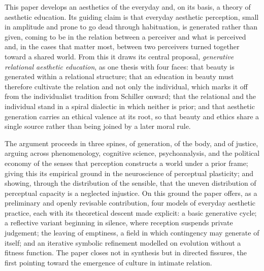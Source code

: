 This paper develops an aesthetics of the everyday and, on its basis, a theory of aesthetic education. Its guiding claim is that everyday aesthetic perception, small in amplitude and prone to go dead through habituation, is generated rather than given, coming to be in the relation between a perceiver and what is perceived and, in the cases that matter most, between two perceivers turned together toward a shared world. From this it draws its central proposal, \emph{generative relational aesthetic education}, as one thesis with four faces: that beauty is generated within a relational structure; that an education in beauty must therefore cultivate the relation and not only the individual, which marks it off from the individualist tradition from Schiller onward; that the relational and the individual stand in a spiral dialectic in which neither is prior; and that aesthetic generation carries an ethical valence at its root, so that beauty and ethics share a single source rather than being joined by a later moral rule.

The argument proceeds in three spines, of generation, of the body, and of justice, arguing across phenomenology, cognitive science, psychoanalysis, and the political economy of the senses that perception constructs a world under a prior frame; giving this its empirical ground in the neuroscience of perceptual plasticity; and showing, through the distribution of the sensible, that the uneven distribution of perceptual capacity is a neglected injustice. On this ground the paper offers, as a preliminary and openly revisable contribution, four models of everyday aesthetic practice, each with its theoretical descent made explicit: a basic generative cycle; a reflective variant beginning in silence, where reception suspends private judgement; the leaving of emptiness, a field in which contingency may generate of itself; and an iterative symbolic refinement modelled on evolution without a fitness function. The paper closes not in synthesis but in directed fissures, the first pointing toward the emergence of culture in intimate relation.
